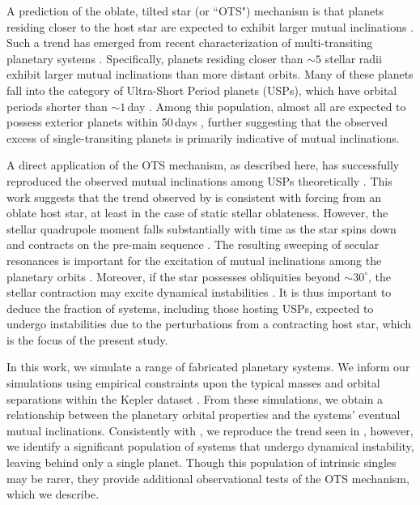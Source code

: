 \documentclass[twocolumn]{aastex63}
\begin{document}
A prediction of the oblate, tilted star (or ``OTS") mechanism is that planets residing closer to the host star are expected to exhibit larger mutual inclinations \citep{spalding2016spin}. Such a trend has emerged from recent characterization of multi-transiting planetary systems \citep{dai2018larger}. Specifically, planets residing closer than $\sim5$ stellar radii exhibit larger mutual inclinations than more distant orbits. Many of these planets fall into the category of Ultra-Short Period planets (USPs), which have orbital periods shorter than $\sim 1$\,day \citep{winn2018kepler}. Among this population, almost all are expected to possess exterior planets within 50\,days \citep{sanchis2014study,adams2020ultra}, further suggesting that the observed excess of single-transiting planets is primarily indicative of mutual inclinations. 

A direct application of the OTS mechanism, as described here, has successfully reproduced the observed mutual inclinations among USPs theoretically \citep{li2020mutual}. This work suggests that the trend observed by \citet{dai2018larger} is consistent with forcing from an oblate host star, at least in the case of static stellar oblateness. However, the stellar quadrupole moment falls substantially with time as the star spins down and contracts on the pre-main sequence \citep{bouvier2014angular}. The resulting sweeping of secular resonances is important for the excitation of mutual inclinations among the planetary orbits \citep{Ward1981solar,spalding2018resilience}. Moreover, if the star possesses obliquities beyond $\sim 30^\circ$, the stellar contraction may excite dynamical instabilities \citep{spalding2018resilience}. It is thus important to deduce the fraction of systems, including those hosting USPs, expected to undergo instabilities due to the perturbations from a contracting host star, which is the focus of the present study. 

In this work, we simulate a range of fabricated planetary systems. We inform our simulations using empirical constraints upon the typical masses and orbital separations within the Kepler dataset
\citep{millholland2017kepler, weiss2018california}. From these simulations, we obtain a relationship between the planetary orbital properties and the systems' eventual mutual inclinations. Consistently with \citet{li2020mutual}, we reproduce the trend seen in \citet{dai2018larger}, however, we identify a significant population of systems that undergo dynamical instability, leaving behind only a single planet. Though this population of intrinsic singles may be rarer, they provide additional observational tests of the OTS mechanism, which we describe. 
\end{document}
